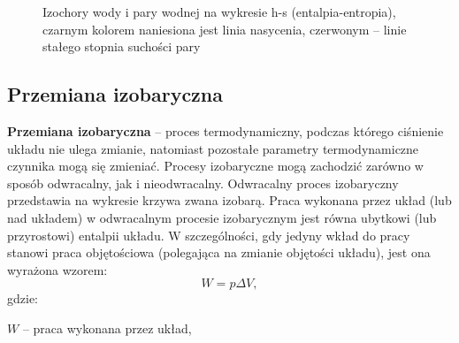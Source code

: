 \documentclass{article}
\begin{document}
\begin{figure}[h]
\centering
\caption[Przemiana izochoryczna]{\label{rys:termo}
    Izochory wody i pary wodnej na wykresie h-s (entalpia-entropia), czarnym kolorem naniesiona jest linia nasycenia, czerwonym – linie stałego stopnia suchości pary
} \vspace{2ex}
\end{figure}

\subsection{Przemiana izobaryczna}
\textbf{Przemiana izobaryczna} – proces termodynamiczny, podczas którego ciśnienie układu nie ulega zmianie, natomiast pozostałe parametry termodynamiczne czynnika mogą się zmieniać. Procesy izobaryczne mogą zachodzić zarówno w sposób odwracalny, jak i nieodwracalny. Odwracalny proces izobaryczny przedstawia na wykresie krzywa zwana izobarą. Praca wykonana przez układ (lub nad układem) w odwracalnym procesie izobarycznym jest równa ubytkowi (lub przyrostowi) entalpii układu. W szczególności, gdy jedyny wkład do pracy stanowi praca objętościowa (polegająca na zmianie objętości układu), jest ona wyrażona wzorem:
\begin{equation}
{\displaystyle W=p\Delta V,} 
\end{equation}
gdzie:
\vspace{2ex}

${\displaystyle W}$ – praca wykonana przez układ,
\vspace{2ex}
\end{document}

